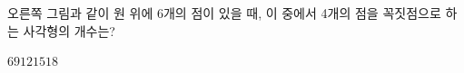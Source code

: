 \noindent\begin{minipage}[t]{0.58\linewidth}\vspace{0pt}\raggedright 오른쪽 그림과 같이 원 위에 6개의 점이 있을 때, 이 중에서 4개의 점을 꼭짓점으로 하는 사각형의 개수는?\end{minipage}\hfill\begin{minipage}[t]{0.4\linewidth}\vspace{0pt}\centering \resizebox{\ifdim\width>\linewidth\linewidth\else\width\fi}{!}{}\end{minipage}\par
\begin{choices32}{$6$}{$9$}{$12$}{$15$}{$18$}\end{choices32}
